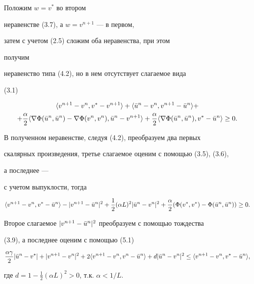 \begin{pf} Положим $w=v^*$ во втором


неравенстве (3.7), а $w=v^{n+1}$ --- в первом,


затем с учетом (2.5) сложим оба неравенства, при этом


получим


неравенство типа (4.2), но в нем отсутствует слагаемое вида


(3.1)


\begin{multline}


\la v^{n+1}-v^n,v^*-v^{n+1}\ra+


\la\Bar u^n-v^n,v^{n+1}-\Bar u^n\ra+\\


+\frac{\alpha}{2}\la\nabla\Phi(\Bar u^n,\Bar u^n)-\nabla\Phi


(v^n,v^n),\Bar u^n-v^{n+1}\ra+\frac{\alpha}{2}


\la\nabla\Phi(\Bar u^n,\Bar u^n),v^*-\Bar u^n\ra\ge 0.


\end{multline}


В полученном неравенстве, следуя (4.2), преобразуем два первых


скалярных произведения, третье слагаемое оценим с помощью (3.5), (3.6),


а последнее ---


с учетом выпуклости, тогда


$$


\la v^{n+1}-v^n,v^*-\Bar u^n\ra-|v^{n+1}-\Bar u^n|^2+


\frac{1}{2}(\alpha L)^2|\Bar u^n-v^n|^2+\frac{\alpha}{2}


(\Phi(v^*,v^*)-\Phi(\Bar u^n,\Bar u^n))\ge 0.


$$


Второе слагаемое $|v^{n+1}-\Bar u^n|^2$ преобразуем с помощью тождества


(3.9), а последнее оценим с помощью (5.1)


$$


\frac{\alpha\gamma}{2}|\Bar u^n-v^*|+|v^{n+1}-v^n|^2


+2\la v^{n+1}-v^n,v^n-\Bar u^n\ra +d|\Bar u^n-v^n|^2\le


\la v^{n+1}-v^n,v^*-\Bar u^n\ra,


$$


где $d=1-\frac{1}{2}(\alpha L)^2>0$, т.к. $\alpha<1/L$.






\end{pf}
